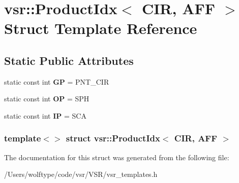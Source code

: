 \hypertarget{structvsr_1_1_product_idx_3_01_c_i_r_00_01_a_f_f_01_4}{\section{vsr\-:\-:Product\-Idx$<$ C\-I\-R, A\-F\-F $>$ Struct Template Reference}
\label{structvsr_1_1_product_idx_3_01_c_i_r_00_01_a_f_f_01_4}
}
\subsection*{Static Public Attributes}
\begin{DoxyCompactItemize}
\item 
\hypertarget{structvsr_1_1_product_idx_3_01_c_i_r_00_01_a_f_f_01_4_a9c60c94c8f296b11f951c183a508bf19}{static const int {\bfseries G\-P} = P\-N\-T\-\_\-\-C\-I\-R}\label{structvsr_1_1_product_idx_3_01_c_i_r_00_01_a_f_f_01_4_a9c60c94c8f296b11f951c183a508bf19}

\item 
\hypertarget{structvsr_1_1_product_idx_3_01_c_i_r_00_01_a_f_f_01_4_a58b1f1b3e8955f9026225194cf9b4fec}{static const int {\bfseries O\-P} = S\-P\-H}\label{structvsr_1_1_product_idx_3_01_c_i_r_00_01_a_f_f_01_4_a58b1f1b3e8955f9026225194cf9b4fec}

\item 
\hypertarget{structvsr_1_1_product_idx_3_01_c_i_r_00_01_a_f_f_01_4_adefbb32b4d2028293af98ccc96f662ed}{static const int {\bfseries I\-P} = S\-C\-A}\label{structvsr_1_1_product_idx_3_01_c_i_r_00_01_a_f_f_01_4_adefbb32b4d2028293af98ccc96f662ed}

\end{DoxyCompactItemize}
\subsubsection*{template$<$$>$ struct vsr\-::\-Product\-Idx$<$ C\-I\-R, A\-F\-F $>$}



The documentation for this struct was generated from the following file\-:\begin{DoxyCompactItemize}
\item 
/\-Users/wolftype/code/vsr/\-V\-S\-R/vsr\-\_\-templates.\-h\end{DoxyCompactItemize}
